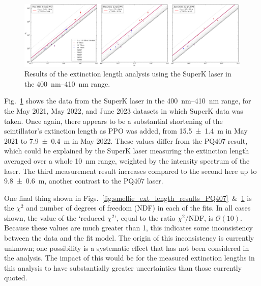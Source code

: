 \begin{figure}
    \centering
    \includegraphics[width=\textwidth]{5_SMELLIEAnalysis/images/rsrw_plot_combined_superK[400,410].pdf}
    \caption[Results of the extinction length analysis using the SuperK laser in the \SIrange{400}{410}{\nm} range]
    {Results of the extinction length analysis using the SuperK laser in the \SIrange{400}{410}{\nm} range.}
    \label{fig:smellie_ext_length_results_SK_400410}
\end{figure}

Fig.~\ref{fig:smellie_ext_length_results_SK_400410} shows the data from the SuperK laser in the \SIrange{400}{410}{\nm} range, for the May 2021, May 2022, and June 2023 datasets in which SuperK data was taken. Once again, there appears to be a substantial shortening of the scintillator's extinction length as PPO was added, from \SI{15.5 \pm 1.4}{\metre} in May 2021 to \SI{7.9 \pm 0.4}{\metre} in May 2022. These values differ from the PQ407 result, which could be explained by the SuperK laser measuring the extinction length averaged over a whole \SI{10}{\nm} range, weighted by the intensity spectrum of the laser. The third measurement result increases compared to the second here up to \SI{9.8 \pm 0.6}{\metre}, another contrast to the PQ407 laser.

One final thing shown in Figs.~\ref{fig:smellie_ext_length_results_PQ407}~\&~\ref{fig:smellie_ext_length_results_SK_400410} is the $\chi^{2}$ and number of degrees of freedom (NDF) in each of the fits. In all cases shown, the value of the `reduced $\chi^{2}$', equal to the ratio $\chi^{2}/$NDF, is $\mathcal{O}(10)$. Because these values are much greater than 1, this indicates some inconsistency between the data and the fit model. The origin of this inconsistency is currently unknown; one possibility is a systematic effect that has not been considered in the analysis. The impact of this would be for the measured extinction lengths in this analysis to have substantially greater uncertainties than those currently quoted.

